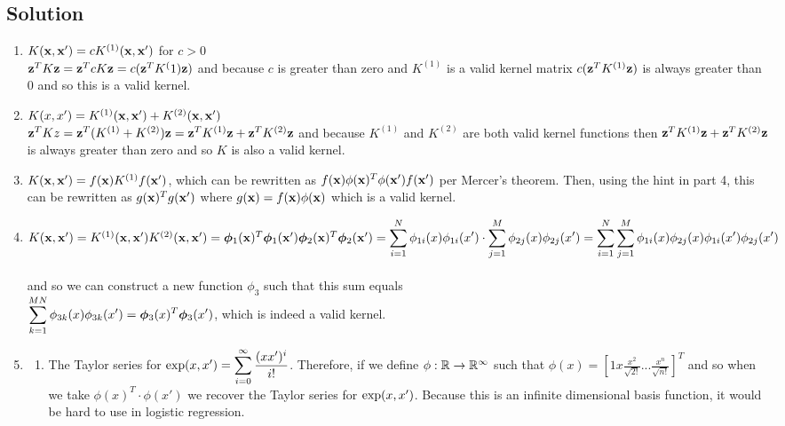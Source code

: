 \documentclass[submit]{harvardml}
\begin{document}
\subsection*{Solution}
\begin{enumerate}
	\item $K(\mathbf{x}, \mathbf{x}') = cK^{(1)}(\mathbf{x},\mathbf{x}')$ for $c > 0$ \\
	$\mathbf{z}^TK\mathbf{z} = \mathbf{z}^TcK\mathbf{z} = c(\mathbf{z}^TK^(1)\mathbf{z})$ and because $c$ is greater than zero and $K^{(1)}$ is a valid kernel matrix $c(\mathbf{z}^TK^{(1)}\mathbf{z})$ is always greater than 0 and so this is a valid kernel.  \\
	
	\item $K(x, x') = K^{(1)}(\mathbf{x},\mathbf{x}') + K^{(2)}(\mathbf{x},\mathbf{x}')$ \\
	$\mathbf{z}^TKz = \mathbf{z}^T(K^{(1)} + K ^{(2)})\mathbf{z} = \mathbf{z}^TK^{(1)}\mathbf{z} + \mathbf{z}^TK^{(2)}\mathbf{z}$ and because $K^{(1)}$ and $K^{(2)}$ are both valid kernel functions then $\mathbf{z}^TK^{(1)}\mathbf{z} + \mathbf{z}^TK^{(2)}\mathbf{z}$ is always greater than zero and so $K$ is also a valid kernel. 
	
	\item $K(\mathbf{x}, \mathbf{x}') = f(\mathbf{x})K^{(1)}f(\mathbf{x}')$, which can be rewritten as $f(\mathbf{x})\phi(\mathbf{x})^T\phi(\mathbf{x}')f(\mathbf{x}')$ per Mercer's theorem.  Then, using the hint in part 4, this can be rewritten as $g(\mathbf{x})^Tg(\mathbf{x}')$ where $g(\mathbf{x}) = f(\mathbf{x})\phi(\mathbf{x})$ which is a valid kernel. 
	
	\item $K(\mathbf{x}, \mathbf{x}') = K^{(1)}(\mathbf{x}, \mathbf{x}')K^{(2)}(\mathbf{x}, \mathbf{x}') \\\\
	= \boldsymbol{\phi}_1(\mathbf{x})^T\boldsymbol{\phi}_1(\mathbf{x}')\boldsymbol{\phi}_2(\mathbf{x})^T\boldsymbol{\phi}_2(\mathbf{x}') \\\\
	= \displaystyle\sum_{i = 1}^{N}\phi_{1i}(x)\phi_{1i}(x') \cdot \displaystyle\sum_{j = 1}^{M}\phi_{2j}(x)\phi_{2j}(x') \\\\
	= \displaystyle\sum_{i = 1}^{N}\displaystyle\sum_{j = 1}^{M} \phi_{1i}(x)\phi_{2j}(x)\phi_{1i}(x')\phi_{2j}(x') $ \\\\
	and so we can construct a new function $\phi_3$ such that this sum equals\\
	$\displaystyle\sum_{k = 1}^{MN}\phi_{3k}(x)\phi_{3k}(x') \\ 
	= \boldsymbol{\phi}_3(x)^T\boldsymbol{\phi}_3(x')$, which is indeed a valid kernel.  
	\item 
	\begin{enumerate}
		\item The Taylor series for $\textup{exp}(x,x') = \displaystyle\sum_{i = 0}^{\infty}\dfrac{(xx')^i}{i!}$.  Therefore, if we define $\phi: \mathbb{R} \to \mathbb{R}^{\infty}$ such that $\phi(x) = [1 x \frac{x^2}{\sqrt{2!}} ... \frac{x^n}{\sqrt{n!}}]^T$ and so when we take $\phi(x)^T\cdot \phi(x')$ we recover the Taylor series for $\textup{exp}(x,x')$. Because this is an infinite dimensional basis function, it would be hard to use in logistic regression.   
		

\end{enumerate}
\end{enumerate}
\end{document}

